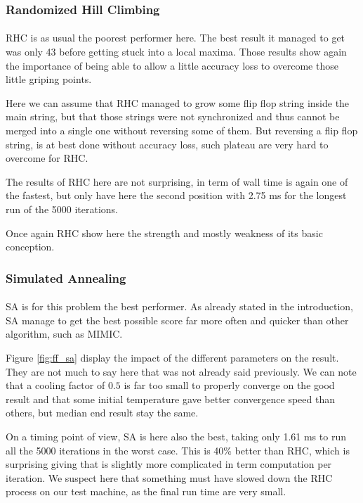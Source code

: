 \documentclass[twocolumn,a4paper,10pt]{article}
\begin{document}
\subsubsection{Randomized Hill Climbing} \label{ff_rhc}
\paragraph{}
RHC is as usual the poorest performer here. The best result it managed to get was only 43 before getting stuck into a local maxima. Those results show again the importance of being able to allow a little accuracy loss to overcome those little griping points.

Here we can assume that RHC managed to grow some flip flop string inside the main string, but that those strings were not synchronized and thus cannot be merged into a single one without reversing some of them. But reversing a flip flop string, is at best done without accuracy loss, such plateau are very hard to overcome for RHC.

The results of RHC here are not surprising, in term of wall time is again one of the fastest, but only have here the second position with 2.75 ms for the longest run of the 5000 iterations.

Once again RHC show here the strength and mostly weakness of its basic conception.

\subsubsection{Simulated Annealing}
\paragraph{}
SA is for this problem the best performer. As already stated in the introduction, SA manage to get the best possible score far more often and quicker than other algorithm, such as MIMIC.

Figure \ref{fig:ff_sa} display the impact of the different parameters on the result. They are not much to say here that was not already said previously. We can note that a cooling factor of $0.5$ is far too small to properly converge on the good result and that some initial temperature gave better convergence speed than others, but median end result stay the same.

On a timing point of view, SA is here also the best, taking only 1.61 ms to run all the 5000 iterations in the worst case. This is 40\% better than RHC, which is surprising giving that is slightly more complicated in term computation per iteration. We suspect here that something must have slowed down the RHC process on our test machine, as the final run time are very small.
\end{document}

